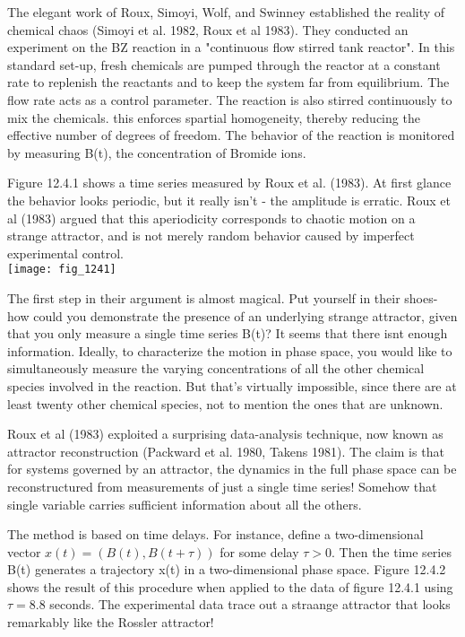 \documentclass{article}
\newcommand\tab[1][1cm]{\hspace*{#1}}
\begin{document}
The elegant work of Roux, Simoyi, Wolf, and Swinney established the reality of chemical chaos (Simoyi et al. 1982, Roux et al 1983). They conducted an experiment on the BZ reaction in a "continuous flow stirred tank reactor". In this standard set-up, fresh chemicals are pumped through the reactor at a constant rate to replenish the reactants and to keep the system far from equilibrium. The flow rate acts as a control parameter. The reaction is also stirred continuously to mix the chemicals. this enforces spartial homogeneity, thereby reducing the effective number of degrees of freedom. The behavior of the reaction is monitored by measuring B(t), the concentration of Bromide ions. \\ \tab

Figure 12.4.1 shows a time series measured by Roux et al. (1983). At first glance the behavior looks periodic, but it really isn't - the amplitude is erratic. Roux et al (1983) argued that this aperiodicity corresponds to chaotic motion on a strange attractor, and is not merely random behavior caused by imperfect experimental control. \\

\texttt{[image: fig\_1241]}

\tab The first step in their argument is almost magical. Put yourself in their shoes-how could you demonstrate the presence of an underlying strange attractor, given that you only measure a single time series B(t)? It seems that there isnt enough information. Ideally, to characterize the motion in phase space, you would like to simultaneously measure the varying concentrations of all the other chemical species involved in the reaction. But that's virtually impossible, since there are at least twenty other chemical species, not to mention the ones that are unknown. \\ \tab

Roux et al (1983) exploited a surprising data-analysis technique, now known as attractor reconstruction (Packward et al. 1980, Takens 1981). The claim is that for systems governed by an attractor, the dynamics in the full phase space can be reconstructured from measurements of just a single time series! Somehow that single variable carries sufficient information about all the others. \\ \tab

The method is based on time delays. For instance, define a two-dimensional vector $x(t)=(B(t), B(t+\tau))$ for some delay $\tau > 0$. Then the time series B(t) generates a trajectory x(t) in a two-dimensional phase space. Figure 12.4.2 shows the result of this procedure when applied to the data of figure 12.4.1 using $\tau=8.8$ seconds. The experimental data trace out a straange attractor that looks remarkably like the Rossler attractor! \\ \tab
\end{document}

